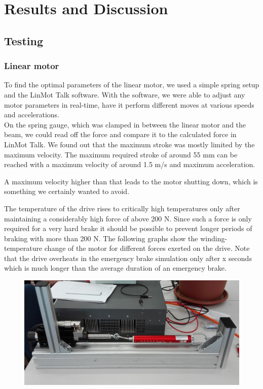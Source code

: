 
\chapter{Results and Discussion}
\label{chp:Results}

\section{Testing}

\subsection{Linear motor}

To find the optimal parameters of the linear motor, we used a simple spring setup and the LinMot Talk software. With the software, we were able to adjust any motor parameters in real-time, have it perform different moves at various speeds and accelerations. \\On the spring gauge, which was clamped in between the linear motor and the beam, we could read off the force and compare it to the calculated force in LinMot Talk. We found out that the maximum stroke was mostly limited by the maximum velocity. The maximum required stroke of around 55 mm can be reached with a maximum velocity of around 1.5 m/s and maximum acceleration.
 
A maximum velocity higher than that leads to the motor shutting down, which is something we certainly wanted to avoid. 
  
The temperature of the drive rises to critically high temperatures only after maintaining a considerably high force of above 200 N. Since such a force is only required for a very hard brake it should be possible to prevent longer periods of braking with more than 200 N. The following graphs show the winding-temperature change of the motor for different forces exerted on the drive.
Note that the drive overheats in the emergency brake simulation only after x seconds which is much longer than the average duration of an emergency brake.

\begin{figure}[h]
	\centering
	\includegraphics[width=0.7\linewidth]{pictures_figures/Used/Picture_linmottest}
	\caption{}
	\label{fig:picturelinmottest}
\end{figure}



